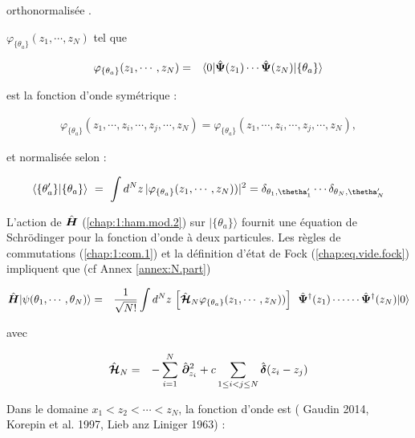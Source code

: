 orthonormalisée .


 \(\varphi_{\{\theta_a\}}(z_1, \cdots ,  z_N)\) tel que 

\begin{eqnarray}
	\varphi_{\{\theta_a\}}(z_1, \cdots ,  z_N) & = & 	\langle 0 \vert  \hat{\bm{\Psi}}(z_1) \cdots  \hat{\bm{\Psi}}(z_N)\vert  \{\theta_a\}  \rangle 
\end{eqnarray}


est la fonction d’onde symétrique :

\begin{eqnarray}
	\varphi_{\{\theta_a\}}(z_1, \cdots ,z_i , \cdots , z_j,  \cdots ,  z_N) = \varphi_{\{\theta_a\}}(z_1, \cdots ,z_i , \cdots , z_j,  \cdots ,  z_N),
\end{eqnarray}

et normalisée selon :

\begin{eqnarray}
	\langle \{\theta_a'\} \vert \{\theta_a\} \rangle ~=~ \int d^Nz\,  |\varphi_{\{\theta_a\}}(z_1, \cdots ,  z_N))|^2 = \delta_{\theta_1,\thetha_1'} \cdots \delta_{\theta_N,\thetha_N'}
\end{eqnarray}

L’action de \(\hat{\bm{H}}\) (\ref{chap:1:ham.mod.2}) sur \(\vert \{\theta_a\} \rangle\) fournit une équation de Schrödinger pour la fonction d’onde à deux particules. Les règles de commutations (\ref{chap:1:com.1}) et la définition d'état de Fock (\ref{chap:eq.vide.fock}) impliquent que (cf Annex \ref{annex:N.part})

%



\begin{eqnarray}
	\operator{H}\vert \psi ( \theta_1 , \cdots , \theta_N ) \rangle &= &  \frac{1}{ \sqrt{N!}} \int d^N z \,  	\left [ \operator{\mathcal{H}}_N \varphi_{\{\theta_a\}}(z_1, \cdots ,  z_N)) \right ] \, \operator{\Psi}^\dag(z_1) \cdots  \cdots\operator{\Psi}^\dag(z_N) \vert 0 \rangle		
\end{eqnarray}

avec 

\begin{eqnarray}
	\hat{\bm{\mathcal{H}}}_N & = &  - \sum_{i=1}^N \, \hat{\bm{\partial}}_{z_i}^2 + 	c \sum_{1\leq i<j\leq N} \hat{\bm{\delta}}(z_i - z_j) 		
\end{eqnarray}


Dans le domaine $x_1 < z_2 < \cdots < z_N$, la fonction d'onde est ({\color{blue} Gaudin 2014}, {\color{blue}Korepin et al. 1997}, {\color{blue}Lieb anz Liniger 1963}) :

